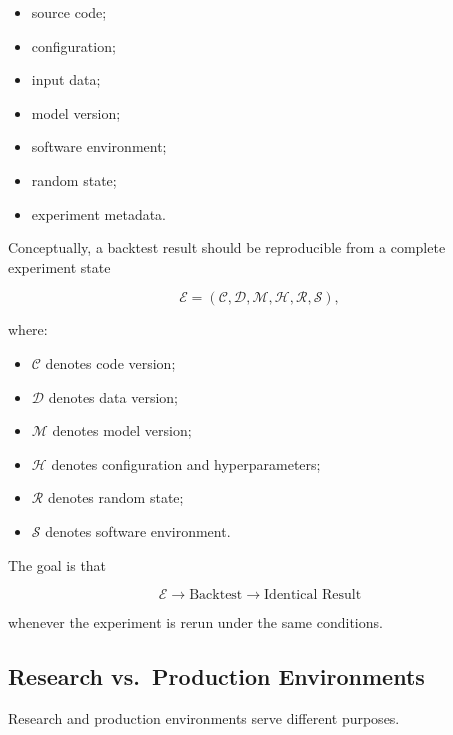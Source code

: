 \documentclass[11pt,a4paper]{article}
\begin{document}
\begin{itemize}
    \item source code;
    \item configuration;
    \item input data;
    \item model version;
    \item software environment;
    \item random state;
    \item experiment metadata.
\end{itemize}

Conceptually, a backtest result should be reproducible from a complete experiment
state

\begin{equation}
\boxed{
\mathcal{E}
=
\left(
\mathcal{C},
\mathcal{D},
\mathcal{M},
\mathcal{H},
\mathcal{R},
\mathcal{S}
\right),
}
\end{equation}

where:

\begin{itemize}
    \item $\mathcal{C}$ denotes code version;
    \item $\mathcal{D}$ denotes data version;
    \item $\mathcal{M}$ denotes model version;
    \item $\mathcal{H}$ denotes configuration and hyperparameters;
    \item $\mathcal{R}$ denotes random state;
    \item $\mathcal{S}$ denotes software environment.
\end{itemize}

The goal is that

\begin{equation}
\boxed{
\mathcal{E}
\rightarrow
\text{Backtest}
\rightarrow
\text{Identical Result}
}
\end{equation}

whenever the experiment is rerun under the same conditions.


\subsection{Research vs.\ Production Environments}
\label{subsec:research_vs_production}

Research and production environments serve different purposes.
\end{document}
